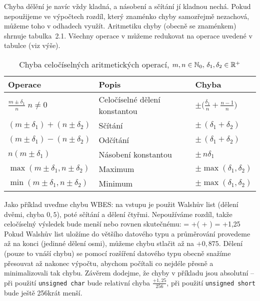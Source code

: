         Chyba dělění je navíc vždy kladná, a násobení a sčítání jí kladnou nechá. Pokud nepoužijeme ve výpočtech rozdíl, který znaménko chyby samozřejmě nezachová, můžeme toho v odhadech využít. Aritmetiku chyby (obecně se znaménkem) shrnuje tabulka~2.1. Všechny operace v \LAsq můžeme redukovat na operace uvedené v tabulce (viz výše).

        \begin{table}[h]
    \begin{center}
    \begin{tabular}{lll}
      \toprule
      Operace & Popis & Chyba\\
      \midrule
      $\frac{m\pm\delta_1}{n} \; n \neq 0 $ & Celočíselné dělení konstantou & $\pm \Big( \frac{\delta_1}{n} + \frac{n-1}{n}\Big)$ \\
      $(m\pm\delta_1)+(n\pm\delta_2) $      & Sčítání                       & $\pm \,(\delta_1+\delta_2)$ \\
      $(m\pm\delta_1)-(n\pm\delta_2) $      & Odčítání                      & $\pm \,(\delta_1+\delta_2)$ \\
      $n(m\pm\delta_1) $                    & Násobení konstantou           & $\pm \,n\delta_1$ \\
      $\max(m\pm\delta_1,n\pm\delta_2) $    & Maximum                       & $\pm \max(\delta_1,\delta_2)$ \\
      $\min(m\pm\delta_1,n\pm\delta_2) $    & Minimum                       & $\pm \max(\delta_1,\delta_2)$ \\
      \bottomrule
    \end{tabular}
    \caption{Chyba celočíselných aritmetických operací, $m,n \in \mathbb{N}_0, \,\delta_1,\delta_2 \in \mathbb{R}^+$}
    \end{center}
        \end{table}\label{tabulka max chyby}

        Jako příklad uveďme chybu WBES: na vstupu je použit Walshův list (dělení dvěmi, chyba $0,5$), poté sčítání a dělení čtyřmi. Nepoužíváme rozdíl, takže celočíselný výsledek bude menší nebo rovnen skutečnému:
        \beq
        \delta = +\Big(  +  \Big) = +1,25
        \eeq
        Pokud Walshův list uložíme do většího datového typu a průměrování provedeme až na konci (jedinné dělení osmi), můžeme chybu stlačit až na $+0,875$. Dělení (pouze to vnáší chybu) se pomocí rozšíření datového typu obecně snažíme přesouvat až nakonec výpočtu, abychom počítali co nejdéle přesně a minimalizovali tak chybu. Závěrem dodejme, že chyby v příkladu jsou absolutní -- při použití {\tt unsigned char} bude relativní chyba $\frac{+1,25}{256}$, při použití {\tt unsigned short} bude ještě 256krát menší. 

